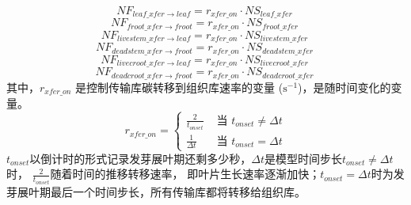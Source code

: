\begin{enumerate}
\begin{equation}
  NF_{leaf\_{xfer}\rightarrow leaf} = r_{{xfer}\_{on}}\cdot NS_{leaf\_{xfer}}\ 
\end{equation}
\begin{equation}
  NF_{froot\_{xfer}\rightarrow froot} = r_{{xfer}\_{on}}\cdot NS_{froot\_{xfer}}\ 
\end{equation}
\begin{equation}
  NF_{livestem\_{xfer}\rightarrow leaf} = r_{{xfer}\_{on}}\cdot NS_{livestem\_{xfer}}\ 
\end{equation}
\begin{equation}
  NF_{deadstem\_{xfer}\rightarrow froot} = r_{{xfer}\_{on}}\cdot NS_{deadstem\_{xfer}}\ 
\end{equation}
\begin{equation}
  NF_{livecroot\_{xfer}\rightarrow leaf} = r_{{xfer}\_{on}}\cdot NS_{livecroot\_{xfer}}\ 
\end{equation}
\begin{equation}
  NF_{deadcroot\_{xfer}\rightarrow froot} = r_{{xfer}\_{on}}\cdot NS_{deadcroot\_{xfer}}\ 
\end{equation}
其中，$r_{{xfer}\_{on}}$ 是控制传输库碳转移到组织库速率的变量 ($\mathrm{s^{-1}}$)，是随时间变化的变量。
\begin{equation}
r_{xfer\_{on}}=\left\{\begin{array}{ll}\frac{2}{t_{ {onset}}} &  \text{ 当 }  t_{ {onset}} \neq \Delta t \\ 
\frac{1}{\Delta t} &  \text{ 当 }  t_{onset}=\Delta t\end{array}\right.
\end{equation}
$t_{onset}$以倒计时的形式记录发芽展叶期还剩多少秒，$\Delta t$是模型时间步长$t_{onset}\neq\Delta t$时，
$\frac{2}{t_{onset}}$随着时间的推移转移速率，
即叶片生长速率逐渐加快；$t_{onset}=\Delta t$时为发芽展叶期最后一个时间步长，所有传输库都将转移给组织库。\\


\end{enumerate}
